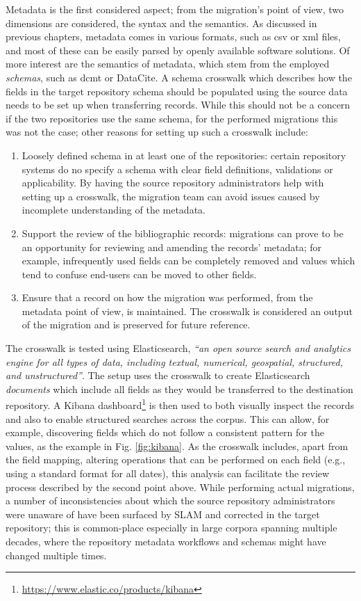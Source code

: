 Metadata is the first considered aspect; from the migration's point of view, two dimensions are considered, the syntax and the semantics. As discussed in previous chapters, metadata comes in various formats, such as \gls{csv} or \gls{xml} files, and most of these can be easily parsed by openly available software solutions. Of more interest are the semantics of metadata, which stem from the employed \emph{schemas}, such as \gls{dcmt} or DataCite. A schema crosswalk which describes how the fields in the target repository schema should be populated using the source data needs to be set up when transferring records. While this should not be a concern if the two repositories use the same schema, for the performed migrations this was not the case; other reasons for setting up such a crosswalk include:
\begin{enumerate}
    \item Loosely defined schema in at least one of the repositories: certain repository systems do no specify a schema with clear field definitions, validations or applicability. By having the source repository administrators help with setting up a crosswalk, the migration team can avoid issues caused by incomplete understanding of the metadata.
    \item Support the review of the bibliographic records: migrations can prove to be an opportunity for reviewing and amending the records' metadata; for example, infrequently used fields can be completely removed and values which tend to confuse end-users can be moved to other fields.
    \item Ensure that a record on how the migration was performed, from the metadata point of view, is maintained. The crosswalk is considered an output of the migration and is preserved for future reference. 
\end{enumerate}

The crosswalk is tested using Elasticsearch, \emph{``an open source search and analytics engine for all types of data, including textual, numerical, geospatial, structured, and unstructured''}\cite{elastic}. The setup uses the crosswalk to create Elasticsearch \emph{documents} which include all fields as they would be transferred to the destination repository. A Kibana dashboard\footnote{\url{https://www.elastic.co/products/kibana}} is then used to both visually inspect the records and also to enable structured searches across the corpus. This can allow, for example, discovering fields which do not follow a consistent pattern for the values, as the example in Fig. \ref{fig:kibana}. As the crosswalk includes, apart from the field mapping, altering operations that can be performed on each field (e.g., using a standard format for all dates), this analysis can facilitate the review process described by the second point above. While performing actual migrations, a number of inconsistencies about which the source repository administrators were unaware of have been surfaced by SLAM and corrected in the target repository; this is common-place especially in large corpora spanning multiple decades, where the repository metadata workflows and schemas might have changed multiple times.

